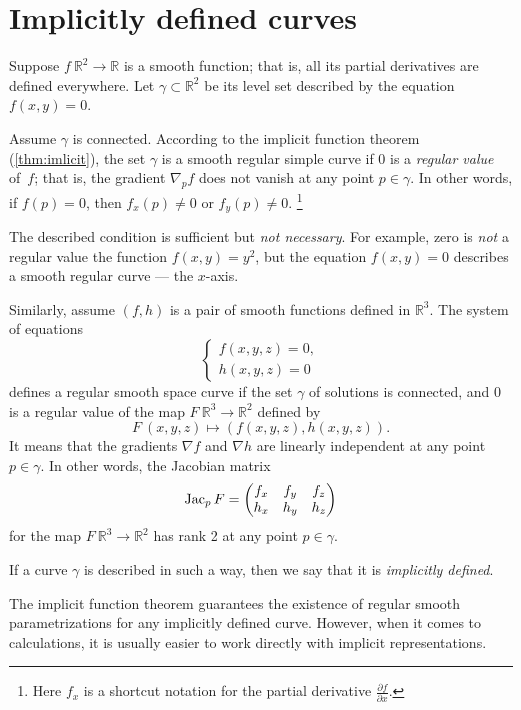\section{Implicitly defined curves}\label{sec:implicit-curves}

Suppose $f\:\mathbb{R}^2\to \mathbb{R}$ is a smooth function; 
that is, all its partial derivatives are defined everywhere.
Let $\gamma\subset \mathbb{R}^2$ be its level set described by  the equation $f(x,y)=0$.

Assume $\gamma$ is connected.
According to the implicit function theorem (\ref{thm:imlicit}), the set $\gamma$ is a smooth regular simple curve if $0$ is a \emph{regular value} of~$f$; that is, the gradient $\nabla_p f$ does not vanish at any point $p\in \gamma$.
In other words, if $f(p)=0$, then   
$f_x(p)\ne 0$ or $f_y(p)\ne 0$.%
\footnote{Here $f_x$ is a shortcut notation for the partial derivative
$\tfrac{\partial f}{\partial x}$.}

The described condition is sufficient but \textit{not necessary}.
For example, zero is \textit{not} a regular value the function $f(x,y)=y^2$, but the equation $f(x,y)=0$ describes a smooth regular curve --- the $x$-axis.

Similarly, assume $(f,h)$ is a pair of smooth functions defined in $\mathbb{R}^3$.
The system of equations
\[\begin{cases}
   f(x,y,z)=0,
   \\
   h(x,y,z)=0
  \end{cases}
\]
defines a regular smooth space curve if the set $\gamma$ of solutions is connected, and $0$ is a regular value of the map $F\:\mathbb{R}^3\to\mathbb{R}^2$ defined by
\[F\:(x,y,z)\mapsto (f(x,y,z),h(x,y,z)).\]
It means that the gradients $\nabla f$ and $\nabla h$ are linearly independent at any point $p\in \gamma$.
In other words, the Jacobian matrix
\[
\mathop{\rm Jac}\nolimits_pF=\begin{pmatrix}
f_x&f_y&f_z\\
h_x&h_y&h_z
\end{pmatrix}
\]
for the map $F\:\mathbb{R}^3\to\mathbb{R}^2$ has rank 2 at any point $p \in \gamma$.

If a curve $\gamma$ is described in such a way,
then we say that it is \emph{implicitly defined}.

The implicit function theorem guarantees the existence of regular smooth parametrizations for any implicitly defined curve.
However, when it comes to calculations, it is usually easier to work directly with implicit representations. 

